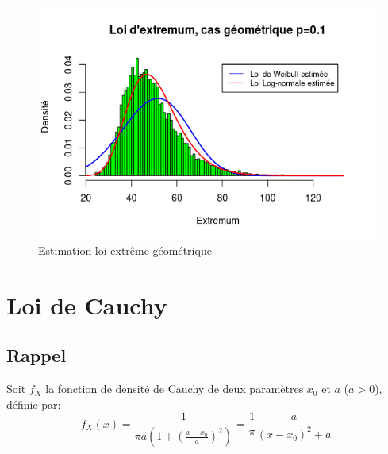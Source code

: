 \documentclass[12pt,a4paper,titlepage]{article}
\numberwithin{equation}{section}
\begin{document}
\begin{figure}[!h]
\begin{center}
 \includegraphics[scale=0.7]{images/RplotGeomExtrem.png} 
\end{center}
 \caption{Estimation loi extrême géométrique}
 \label{Estimation loi extrême géométrique}
\end{figure}



\newpage


\section{Loi de Cauchy}
\subsection{Rappel}
Soit $f_X$ la fonction de densité de Cauchy de deux paramètres $x_0$ et $a$ ($a>0$), définie par:
\begin{equation}
\label{dCauchy}
{f_X}\left( x \right) = \frac{1}{{\pi a\left( {1 + {{\left( {\frac{{x - {x_0}}}{a}} \right)}^2}} \right)}} = \frac{1}{\pi }\frac{a}{{{{\left( {x - {x_0}} \right)}^2} + a}}
\end{equation}
\end{document}

